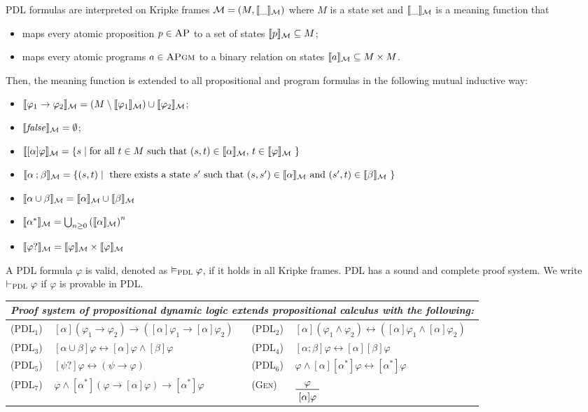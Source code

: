 \documentclass[letter,12pt]{article}
\newcommand{\imp}{\to}
\newcommand{\dimp}{\leftrightarrow}
\newcommand{\MM}{\mathcal{M}}
\newcommand{\prule}[1]{\textsc{(#1)}}
\newcommand{\AP}{\textsc{AP}}
\newcommand{\APgm}{\textsc{APgm}}
\newcommand{\false}{\mathit{false}}
\DeclarePairedDelimiter{\bracket}{\llbracket}{\rrbracket}
\newcommand{\bracketM}[1]{{\bracket{#1}_\MM}}
\newcommand{\PDL}{\textsc{PDL}}
\newcommand{\PDLseq}{\mathbin{;}}
\newcommand{\PDLunion}{\mathbin{\cup}}
\newcommand{\PDLstar}{^*}
\newcommand{\PDLquestion}{{?}}
\begin{document}
PDL formulas are interpreted on Kripke frames
$\MM = (M,\bracketM{\_})$ where $M$ is a state set and 
$\bracketM{\_}$ is a meaning function that
\begin{itemize}
\item maps every atomic proposition $p \in \AP$ to a set of states $\bracketM{p} \subseteq M$;
\item maps every atomic programs $a \in \APgm$ to a binary relation on states
      $\bracketM{a} \subseteq M \times M$.
\end{itemize}
Then, the meaning function is extended to all propositional and program formulas
in the following mutual inductive way:
\begin{itemize}
\item $\bracketM{\varphi_1 \imp \varphi_2} = 
       (M \setminus \bracketM{\varphi_1}) \cup \bracketM{\varphi_2}$;
\item $\bracketM{\false} = \emptyset$;
\item $\bracketM{[\alpha] \varphi}
       = \{ s \mid \text{for all $t \in M$ such that $(s,t) \in \bracketM{\alpha}$,
                         $t \in \bracketM{\varphi}$ } \}$
\item $\bracketM{\alpha \PDLseq \beta} =
       \{ (s,t) \mid \text{
       there exists a state $s'$ such that
       $(s,s') \in \bracketM{\alpha}$ and $(s',t) \in \bracketM{\beta}$
        } \}$
\item $\bracketM{\alpha \PDLunion \beta} =
       \bracketM{\alpha} \cup \bracketM{\beta}$
\item $\bracketM{\alpha \PDLstar} =
       \bigcup_{n \ge 0} \left(\bracketM{\alpha}\right)^n$
\item $\bracketM{\varphi\PDLquestion} = \bracketM{\varphi} \times \bracketM{\varphi}$
\end{itemize}
A PDL formula $\varphi$ is valid, denoted as $\vDash_\PDL \varphi$,
if it holds in all Kripke frames.
PDL has a sound and complete proof system.
We write $\vdash_\PDL \varphi$ if $\varphi$ is provable in PDL.
\begin{center}
\begin{tabular}{lm{5cm}lm{5cm}}
\multicolumn{4}{l}{
\em
Proof system of propositional dynamic logic extends propositional calculus with
the following:
}
\\\hline
\prule{PDL$_1$} &
$[\alpha] (\varphi_1 \imp \varphi_2) \imp ([\alpha] \varphi_1 \imp [\alpha] \varphi_2)$
&
\prule{PDL$_2$} &
$[\alpha] (\varphi_1 \wedge \varphi_2) \dimp ([\alpha] \varphi_1 \wedge [\alpha] \varphi_2)$
\\
\prule{PDL$_3$} &
$[\alpha \PDLunion \beta] \varphi \dimp [\alpha] \varphi \wedge [\beta] \varphi$
&
\prule{PDL$_4$} &
$[\alpha \PDLseq \beta] \varphi \dimp [\alpha][\beta]\varphi$
\\
\prule{PDL$_5$} &
$[\psi \PDLquestion] \varphi \dimp (\psi \imp \varphi)$
&
\prule{PDL$_6$} &
$\varphi \wedge [\alpha][\alpha \PDLstar]\varphi \dimp [\alpha \PDLstar]\varphi$
\\
\prule{PDL$_7$} &
$\varphi \wedge [\alpha\PDLstar](\varphi \imp [\alpha]\varphi) \imp [\alpha \PDLstar] \varphi$
&
\prule{Gen} &
$\prftree{\varphi}{[\alpha]\varphi}$
\end{tabular}
\end{center}
\end{document}
